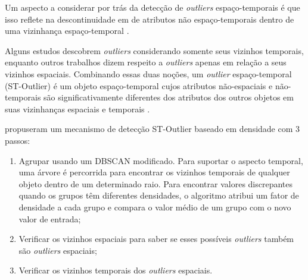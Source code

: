 Um aspecto a considerar por trás da detecção de \textit{outliers} espaço-temporais é que isso reflete na descontinuidade em de atributos não espaço-temporais dentro de uma vizinhança espaço-temporal \cite{cheng:2014}.

Alguns estudos descobrem \textit{outliers} considerando somente seus vizinhos temporais, enquanto outros trabalhos dizem respeito a \textit{outliers} apenas em relação a seus vizinhos espaciais. Combinando essas duas noções, um \textit{outlier} espaço-temporal (ST-Outlier) é um objeto espaço-temporal cujos atributos não-espaciais e não-temporais são significativamente diferentes dos atributos dos outros objetos em suas vizinhanças espaciais e temporais \cite{gupta:2014}.

\cite{Birant2006SpatiotemporalOD} propuseram um mecanismo de detecção ST-Outlier baseado em densidade com 3 passos:
\begin{enumerate}
    \item Agrupar usando um DBSCAN modificado. Para suportar o aspecto temporal, uma árvore é percorrida para encontrar
os vizinhos temporais de qualquer objeto dentro de um determinado raio. Para encontrar valores discrepantes quando os grupos têm diferentes densidades, o algoritmo atribui um fator de densidade a cada grupo e compara o valor médio de um grupo com o novo valor de entrada;
    \item Verificar os vizinhos espaciais para saber se esses possíveis \textit{outliers} também são \textit{outliers} espaciais;
    \item Verificar os vizinhos temporais dos \textit{outliers} espaciais.
\end{enumerate}
